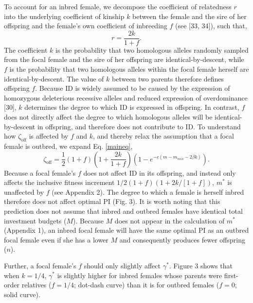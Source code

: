 \documentclass[12pt]{article}
\begin{document}
To account for an inbred female, we decompose the coefficient of relatedness $r$ into the underlying coefficient of kinship $k$ between the female and the sire of her offspring and the female's own coefficient of inbreeding $f$ (see [33, 34]), such that,
\begin{equation} \label{rdef}
r = \frac{2k}{1 + f}.
\end{equation}
The coefficient $k$ is the probability that two homologous alleles randomly sampled from the focal female and the sire of her offspring are identical-by-descent, while $f$ is the probability that two homologous alleles within the focal female herself are identical-by-descent. The value of $k$ between two parents therefore defines offspring $f$. Because ID is widely assumed to be caused by the expression of homozygous deleterious recessive alleles and reduced expression of overdominance [30], $k$ determines the degree to which ID is expressed in offspring. In contrast, $f$ does not directly affect the degree to which homologous alleles will be identical-by-descent in offspring, and therefore does not contribute to ID. To understand how $\zeta_{\textrm{off}}$ is affected by $f$ and $k$, and thereby relax the assumption that a focal female is outbred, we expand Eq. \ref{maineq},
\begin{equation} \label{maineqr}
\zeta_{\textrm{off}} = \frac{1}{2}\left(1+f\right)\left(1+\frac{2k}{1+f}\right)\left(1-e^{-c\left(m-m_{min}-2\beta k\right)}\right).
\end{equation}
Because a focal female's $f$ does not affect ID in its offspring, and instead only affects the inclusive fitness increment $1/2\left(1+f\right)\left(1+ 2 k / \left[1 + f\right]\right)$, $m^{*}$ is unaffected by $f$  (see Appendix 2). The degree to which a female is herself inbred therefore does not affect optimal PI (Fig. 3). It is worth noting that this prediction does not assume that inbred and outbred females have identical total investment budgets ($M$). Because $M$ does not appear in the calculation of $m^{*}$ (Appendix 1), an inbred focal female will have the same optimal PI as an outbred focal female even if she has a lower $M$ and consequently produces fewer offspring ($n$).

Further, a focal female's $f$ should only slightly affect $\gamma^{*}$. Figure 3 shows that when $k=1/4$, $\gamma^{*}$ is slightly higher for inbred females whose parents were first-order relatives ($f=1/4$; dot-dash curve) than it is for outbred females ($f=0$; solid curve).
\end{document}
